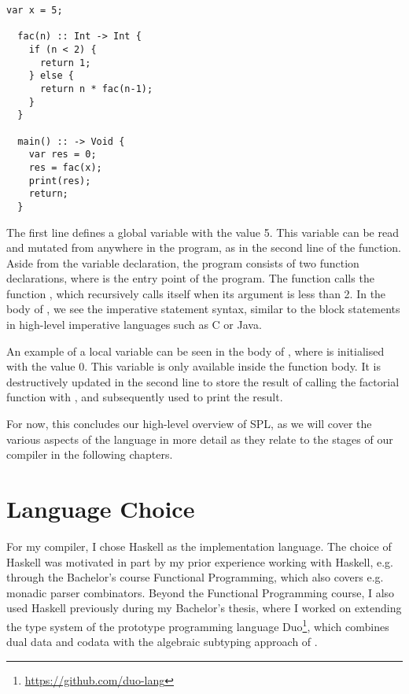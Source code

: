 \begin{lstlisting}[language=spl]
  var x = 5;

  fac(n) :: Int -> Int {
    if (n < 2) {
      return 1;
    } else {
      return n * fac(n-1);
    }
  }

  main() :: -> Void {
    var res = 0;
    res = fac(x);
    print(res);
    return;
  }
\end{lstlisting}

The first line defines a global variable  with the value 5.
This variable can be read and mutated from anywhere in the program, as in the
second line of the  function.
Aside from the variable declaration, the program consists of two function
declarations, where  is the entry point of the program.
The  function calls the function , which recursively
calls itself when its argument  is less than 2.
In the body of , we see the imperative statement syntax, similar to
the block statements in high-level imperative languages such as C or Java.

An example of a local variable can be seen in the body of , where
 is initialised with the value 0. This variable is only available
inside the function body.
It is destructively updated in the second line to store the result of calling
the factorial function with , and subsequently used to print the result.

For now, this concludes our high-level overview of SPL, as we will cover the
various aspects of the language in more detail as they relate to the stages of
our compiler in the following chapters.



\section{Language Choice} \label{sec:intro-lang-choice}

For my compiler, I chose Haskell as the implementation language. The choice
of Haskell was motivated in part by my prior experience working with Haskell,
e.g. through the Bachelor's course Functional Programming, which also covers e.g.
monadic parser combinators.
Beyond the Functional Programming course, I also used Haskell previously during
my Bachelor's thesis, where I worked on extending the type system of the prototype
programming language Duo\footnote{\url{https://github.com/duo-lang}}, which
combines dual data and codata with the algebraic subtyping approach of
\citet{Dolan2017}.

